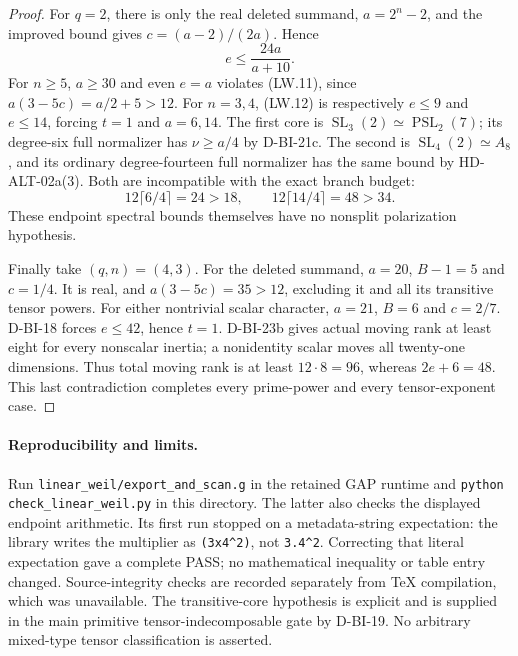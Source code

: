 \begin{proof}
For $q=2$, there is only the real deleted summand,
$a=2^n-2$, and the improved bound gives
$c=(a-2)/(2a)$. Hence
\[
                  e\le\frac{24a}{a+10}.                    \tag{LW.12}
\]
For $n\ge5$, $a\ge30$ and even $e=a$ violates (LW.11), since
$a(3-5c)=a/2+5>12$. For $n=3,4$, (LW.12) is respectively
$e\le9$ and $e\le14$, forcing $t=1$ and $a=6,14$.
The first core is $\operatorname{SL}_3(2)\simeq
\operatorname{PSL}_2(7)$; its degree-six full normalizer has
$\nu\ge a/4$ by D-BI-21c. The second is
$\operatorname{SL}_4(2)\simeq A_8$, and its ordinary degree-fourteen
full normalizer has the same bound by HD-ALT-02a(3).
Both are incompatible with the exact branch budget:
\[
           12\lceil6/4\rceil=24>18,
       \qquad12\lceil14/4\rceil=48>34.                      \tag{LW.13}
\]
These endpoint spectral bounds themselves have no nonsplit
polarization hypothesis.

Finally take $(q,n)=(4,3)$. For the deleted summand, $a=20$,
$B-1=5$ and $c=1/4$. It is real, and
$a(3-5c)=35>12$, excluding it and all its transitive tensor powers.
For either nontrivial scalar character, $a=21$, $B=6$ and
$c=2/7$. D-BI-18 forces $e\le42$, hence $t=1$.
D-BI-23b gives actual moving rank at least eight for every
nonscalar inertia; a nonidentity scalar moves all twenty-one
dimensions. Thus total moving rank is at least
$12\cdot8=96$, whereas $2e+6=48$. This last contradiction
completes every prime-power and every tensor-exponent case.
\end{proof}

\paragraph{Reproducibility and limits.}
Run \texttt{linear\_weil/export\_and\_scan.g} in the retained GAP
runtime and \texttt{python check\_linear\_weil.py} in this directory.
The latter also checks the displayed endpoint arithmetic. Its first
run stopped on a metadata-string expectation: the library writes
the multiplier as \texttt{(3x4\^{}2)}, not \texttt{3.4\^{}2}.
Correcting that literal expectation gave a complete PASS; no
mathematical inequality or table entry changed. Source-integrity
checks are recorded separately from TeX compilation, which was
unavailable. The transitive-core hypothesis is explicit and is
supplied in the main primitive tensor-indecomposable gate by
D-BI-19. No arbitrary mixed-type tensor classification is asserted.
